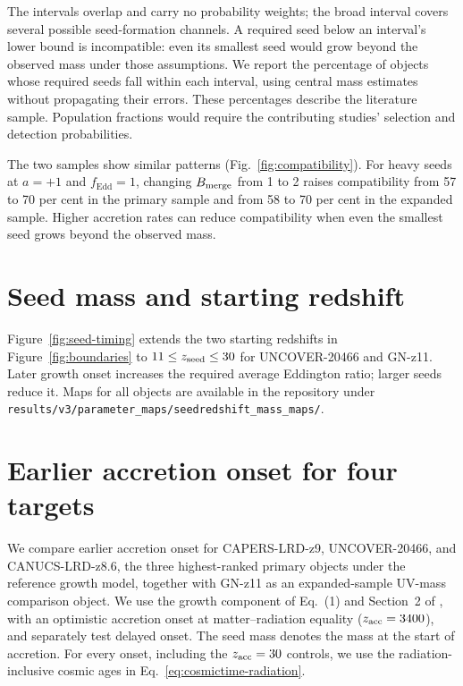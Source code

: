 \documentclass[pdflatex,sn-basic]{sn-jnl}
\newcommand{\fedd}{f_{\mathrm{Edd}}}
\begin{document}
The intervals overlap and carry no probability weights; the broad interval
covers several possible seed-formation channels. A required seed below an
interval's lower bound is incompatible: even its smallest seed would grow
beyond the observed mass under those assumptions.
We report the percentage of objects whose required seeds fall within each
interval, using central mass estimates without propagating their errors.
These percentages describe the literature sample. Population fractions would
require the contributing studies' selection and detection probabilities.

The two samples show similar patterns (Fig.~\ref{fig:compatibility}). For
heavy seeds at $a=+1$ and $\fedd=1$, changing $B_{\rm merge}$ from 1 to 2
raises compatibility from 57 to 70 per cent in the primary sample and from
58 to 70 per cent in the expanded sample. Higher accretion rates can
reduce compatibility when even the smallest seed grows beyond the observed mass.


\FloatBarrier
\section{Seed mass and starting redshift}
\label{app:seed-timing}

Figure~\ref{fig:seed-timing} extends the two starting redshifts in
Figure~\ref{fig:boundaries} to $11\leq z_{\rm seed}\leq30$ for UNCOVER-20466
and GN-z11. Later growth onset increases the required average Eddington ratio;
larger seeds reduce it. Maps for all objects are available in the repository
under \texttt{results/v3/parameter\_maps/seedredshift\_mass\_maps/}.




\section{Earlier accretion onset for four targets}
\label{sec:pbh-v4}

We compare earlier accretion onset for CAPERS-LRD-z9, UNCOVER-20466, and
CANUCS-LRD-z8.6, the three highest-ranked primary objects under the
reference growth model, together with GN-z11 as an expanded-sample UV-mass
comparison object.
We use the growth component of Eq.~(1) and Section~2 of \citet{dayal2024},
with an optimistic accretion onset at matter--radiation equality
($z_{\rm acc}=3400$), and separately test delayed onset. The seed mass denotes
the mass at the start of accretion.
For every onset, including the $z_{\rm acc}=30$ controls, we use the
radiation-inclusive cosmic ages in Eq.~\ref{eq:cosmictime-radiation}.
\end{document}
